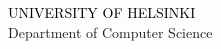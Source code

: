 \documentclass[portrait,a0]{a0poster}
\begin{document}
\begin{minipage}[t]{.98\linewidth} %
\vspace{0pt} %
\begin{flushright}
\begin{spacing}{5}
{\huge{}\textcolor{black}{\MakeUppercase{University of Helsinki}} \MakeUppercase{}}\\
{\Large{}\textcolor{facultyColor}{{Department of Computer Science}}{}}
\end{spacing}
\end{flushright}
\hspace{50pt}

\end{minipage} %




\begin{minipage}[t]{1.5\linewidth}
\vspace{10pt}
\begin{flushleft}
\begin{spacing}{5}

\end{spacing}
\end{flushleft}
\end{minipage}
\end{document}
